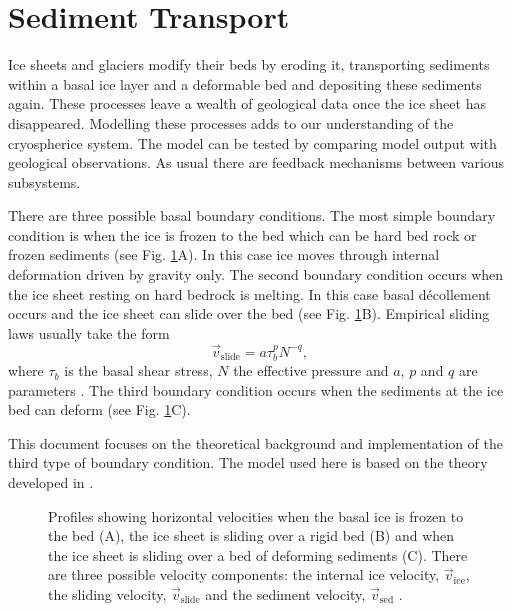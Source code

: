 \section{Sediment Transport}
Ice sheets and glaciers modify their beds by eroding it, transporting sediments within a basal ice layer and a deformable bed and depositing these sediments again. These processes leave a wealth of geological data once the ice sheet has disappeared. Modelling these processes adds to our understanding of the cryospherice system. The model can be tested by comparing model output with geological observations. As usual there are feedback mechanisms between various subsystems.

There are three possible basal boundary conditions. The most simple boundary condition is when the ice is frozen to the bed which can be hard bed rock or frozen sediments (see Fig. \ref{erosion.fig.velos}A). In this case ice moves through internal deformation driven by gravity only.  The second boundary condition occurs when the ice sheet resting on hard bedrock is melting. In this case basal d\'ecollement occurs and the ice sheet can slide over the bed (see Fig. \ref{erosion.fig.velos}B). Empirical sliding laws usually take the form
\begin{equation}
  \vec{v}_{\text{slide}} = a\tau_b^pN^{-q},
\end{equation}
where $\tau_b$ is the basal shear stress, $N$ the effective pressure and $a$, $p$ and $q$ are parameters \citep{Paterson1994}. The third boundary condition occurs when the sediments at the ice bed can deform (see Fig. \ref{erosion.fig.velos}C).

This document focuses on the theoretical background and implementation of the third type of boundary condition. The model used here is based on the theory developed in \citet{Boulton1996a}. 

\begin{figure}[htbp]
  \centering
   
  \caption{Profiles showing horizontal velocities when the basal ice is frozen to the bed (A), the ice sheet is sliding over a rigid bed (B) and when the ice sheet is sliding over a bed of deforming sediments (C). There are three possible velocity components: the internal ice velocity, $\vec{v}_{\text{ice}}$, the sliding velocity, $\vec{v}_{\text{slide}}$ and the sediment velocity, $\vec{v}_{\text{sed}}$ \citep[after][]{Boulton1996a}.}
  \label{erosion.fig.velos}
\end{figure}

